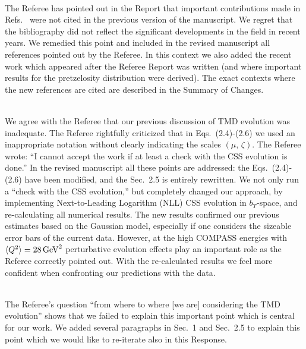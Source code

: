 \documentclass[a4paper]{article}
\begin{document}
\ \\
The Referee has pointed out in the Report that important contributions
made in Refs.~\cite{Gehrmann:2014yya,Echevarria:2015byo,Echevarria:2015usa,Echevarria:2016scs,Li:2016ctv,Vladimirov:2016dll,Luo:2019hmp,Luo:2019szz,Ebert:2020yqt,Gutierrez-Reyes:2017glx,Gutierrez-Reyes:2018iod,Ji:2006ub,Koike:2007dg,Sun:2013hua,Dai:2014ala,Scimemi:2019gge,Collins:1981va,Aybat:2011zv,Angeles-Martinez:2015sea,Ebert:2020dfc} 
were not cited in the previous version of the manuscript. 
We regret that the bibliography did not reflect the significant developments in the field in recent years.
We remedied this point and included in the revised manuscript 
all references pointed out by the Referee. In this context we also added 
the recent work \cite{Moos:2020wvd} which appeared after the Referee Report
was written (and where important results for the pretzelosity distribution
were derived). The exact contexts where
the new references are cited are described in the Summary of Changes. 

\ \\
We agree with the Referee that our previous discussion of TMD 
evolution was inadequate. 
The Referee rightfully criticized that in Eqs.~(2.4)-(2.6) we used
an inappropriate notation without clearly indicating the scales 
$(\mu,\,\zeta)$. The Referee wrote: 
``I cannot accept the work if at least a check
with the CSS evolution is done.''
In the revised manuscript all these points are addressed:   
the Eqs.~(2.4)-(2.6) have been modified, and the Sec.~2.5 is 
entirely rewritten. 
We not only run a ``check with the CSS evolution,'' but completely
changed our approach, by implementing Next-to-Leading Logarithm (NLL) CSS evolution in $b_T$-space,
and re-calculating all numerical results. The new results confirmed
our previous estimates based on the Gaussian model, especially if 
one considers the sizeable error bars of the current data. However,
at the high COMPASS energies with $\langle Q^2\rangle=28\,{\rm GeV}^2$
perturbative evolution effects play an important role as the Referee
correctly pointed out. With the re-calculated results we feel
more confident when confronting our predictions with the data.

\ \\
The Referee's question ``from where to where [we are] 
considering the TMD evolution'' shows that we failed to explain this
important point which is central for our work. We added several paragraphs 
in Sec.~1 and Sec.~2.5 to explain this point which we would
like to re-iterate also in  this Response. 
\end{document}

